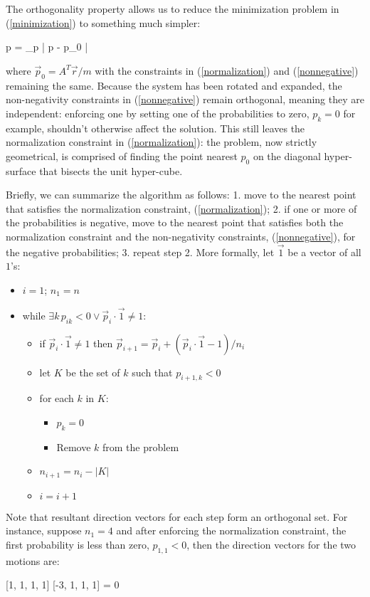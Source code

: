 The orthogonality property allows us to reduce the minimization problem 
in (\ref{minimization}) to something much simpler:
\begin{eqnnon}
	\vec p = \arg \min_{\vec p} | \vec p - \vec p_0 |
\end{eqnnon}
where $\vec p_0 = A^T \vec r/m$ with the constraints in (\ref{normalization}) and
(\ref{nonnegative}) remaining the same.
Because the system has been rotated and expanded, the non-negativity 
constraints in (\ref{nonnegative}) remain orthogonal, meaning they are 
independent: enforcing one by setting one of the probabilities to zero, 
$p_k=0$ for example, shouldn't otherwise affect the solution.
This still leaves the normalization constraint in (\ref{normalization}):
the problem, now strictly geometrical, is comprised of finding the point nearest $p_0$ on the diagonal hyper-surface that bisects the unit hyper-cube.

Briefly, we can summarize the algorithm as follows:
1. move to the nearest point that satisfies the normalization constraint,
(\ref{normalization}); 2. if one or more of the probabilities is negative,
move to the nearest point that satisfies both 
the normalization constraint
and the non-negativity constraints, (\ref{nonnegative}), for the negative probabilities;
3. repeat step 2.
More formally, let $\vec 1$ be a vector of all $1$'s:
\begin{itemize}
	\item $i=1$; $n_1=n$
	\item while $\exists k \, p_{ik} < 0 \lor \vec p_i \cdot \vec 1 \ne 1$:
	\begin{itemize}
		\item if $\vec p_i \cdot \vec 1 \ne 1$ then 
		$\vec p_{i+1} = \vec p_i + (\vec p_i \cdot \vec 1 - 1)/n_i$
		\item let $K$ be the set of $k$ such that $p_{i+1,k} < 0$
		\item for each $k$ in $K$:
		\begin{itemize}
			\item $p_k=0$
			\item Remove $k$ from the problem
		\end{itemize}
		\item $n_{i+1}=n_i-|K|$
		\item $i=i+1$
	\end{itemize}
\end{itemize}

Note that resultant direction vectors for each step form an orthogonal set.
For instance, suppose $n_1=4$ and after enforcing the normalization constraint,
the first probability is less than zero, $p_{1,1} < 0$,
then the direction vectors for the two motions are:
\begin{eqnnon}
	[1, 1, 1, 1] \cdot {} [-3, 1, 1, 1] = 0
\end{eqnnon}

